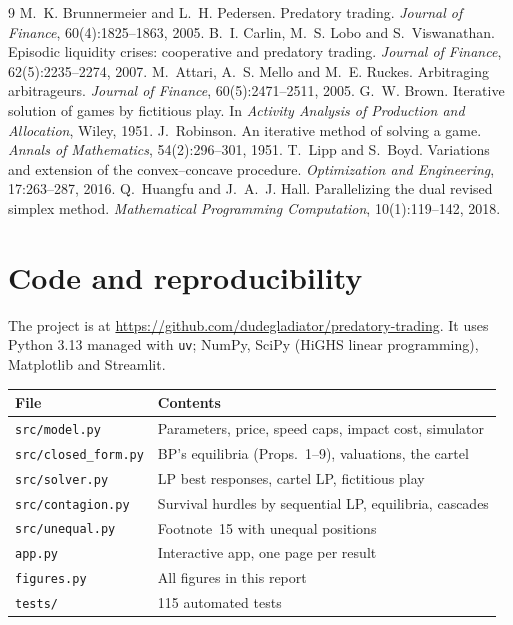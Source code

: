 \documentclass[11pt,a4paper]{article}
\begin{document}
\begin{thebibliography}{9}
 M.~K. Brunnermeier and L.~H. Pedersen. Predatory trading.
  \emph{Journal of Finance}, 60(4):1825--1863, 2005.
 B.~I. Carlin, M.~S. Lobo and S.~Viswanathan. Episodic liquidity crises:
  cooperative and predatory trading. \emph{Journal of Finance}, 62(5):2235--2274, 2007.
 M.~Attari, A.~S. Mello and M.~E. Ruckes. Arbitraging arbitrageurs.
  \emph{Journal of Finance}, 60(5):2471--2511, 2005.
 G.~W. Brown. Iterative solution of games by fictitious play. In
  \emph{Activity Analysis of Production and Allocation}, Wiley, 1951.
 J.~Robinson. An iterative method of solving a game.
  \emph{Annals of Mathematics}, 54(2):296--301, 1951.
 T.~Lipp and S.~Boyd. Variations and extension of the convex--concave
  procedure. \emph{Optimization and Engineering}, 17:263--287, 2016.
 Q.~Huangfu and J.~A.~J. Hall. Parallelizing the dual revised simplex method.
  \emph{Mathematical Programming Computation}, 10(1):119--142, 2018.
\end{thebibliography}

\appendix
\section{Code and reproducibility}
The project is at \url{https://github.com/dudegladiator/predatory-trading}. It uses Python
3.13 managed with \texttt{uv}; NumPy, SciPy (HiGHS linear programming), Matplotlib and
Streamlit.

\begin{center}\small
\begin{tabular}{@{}ll@{}}
  \toprule
  File & Contents \\
  \midrule
  \texttt{src/model.py} & Parameters, price, speed caps, impact cost, simulator \\
  \texttt{src/closed\_form.py} & BP's equilibria (Props.~1--9), valuations, the cartel \\
  \texttt{src/solver.py} & LP best responses, cartel LP, fictitious play \\
  \texttt{src/contagion.py} & Survival hurdles by sequential LP, equilibria, cascades \\
  \texttt{src/unequal.py} & Footnote~15 with unequal positions \\
  \texttt{app.py} & Interactive app, one page per result \\
  \texttt{figures.py} & All figures in this report \\
  \texttt{tests/} & 115 automated tests \\
  \bottomrule
\end{tabular}
\end{center}
\end{document}
